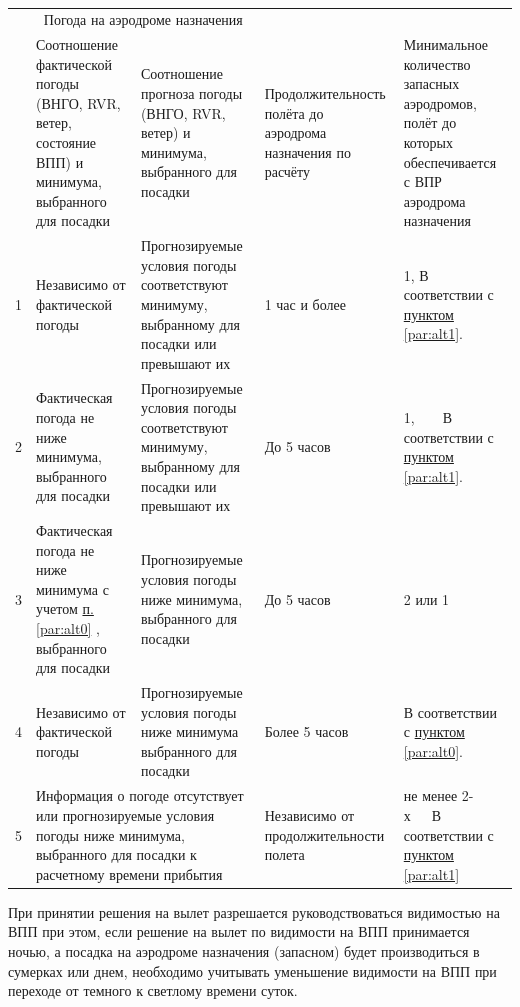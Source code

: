 \begin{table}[H]
    \begin{center}
    \caption{} \label{tbl:04T7}
    \small
    \begin{tabular}{|p{}|p{}|p{}|p{}|p{}|}
    \hline
    &\multicolumn{2}{c|}{Погода на аэродроме назначения}&&\\
    \cline{2-3}
    &Соотношение фактической погоды (ВНГО, RVR, ветер, состояние ВПП) и минимума, выбранного для посадки&Соотношение прогноза погоды (ВНГО, RVR, ветер) и минимума, выбранного для посадки&Продолжительность полёта до аэродрома назначения по расчёту&Минимальное количество запасных аэродромов, полёт до которых обеспечивается с ВПР аэродрома назначения\\
    \hline
    1&Независимо от фактической погоды&Прогнозируемые условия погоды соответствуют минимуму, выбранному для посадки или превышают их&1 час и более&1, В соответствии с \hyperref[par:alt1]{пунктом \ref*{par:alt1}}.\\
    \hline
    2&Фактическая погода не ниже минимума, выбранного для посадки&Прогнозируемые условия погоды соответствуют минимуму, выбранному для посадки или превышают их&До 5 часов&1,\ \ \ \  В соответствии с \hyperref[par:alt1]{пунктом \ref*{par:alt1}}.\\
    \hline
    3&Фактическая погода не ниже минимума с учетом \hyperref[par:alt0]{п. \ref*{par:alt0}} , выбранного для посадки&Прогнозируемые условия погоды ниже минимума, выбранного для посадки&До 5 часов&2 или 1    \\
    \cline{1-4}
    4&Независимо от фактической погоды&Прогнозируемые условия погоды ниже минимума выбранного для посадки&Более 5 часов&В соответствии с  \hyperref[par:alt0]{пунктом \ref*{par:alt0}}.\\
    \hline
    5&\multicolumn{2}{l|}{\parbox{0.49\textwidth}{Информация о погоде отсутствует или прогнозируемые условия погоды ниже минимума, выбранного для посадки к расчетному времени прибытия} }&Независимо от продолжительности полета&не менее 2-х\ \ \  В соответствии с \hyperref[par:alt1]{пунктом \ref*{par:alt1}}\\
    \hline\hline
    \end{tabular}
    \end{center}
\end{table}
	

При принятии решения на вылет разрешается руководствоваться видимостью на ВПП при этом, если решение на вылет по видимости на ВПП принимается ночью, а посадка на аэродроме назначения (запасном) будет производиться в сумерках или днем, необходимо учитывать уменьшение видимости на ВПП при переходе от темного к светлому времени суток.  

